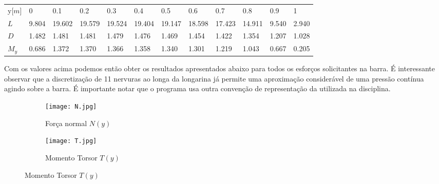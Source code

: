 \documentclass[a4paper]{article}
\begin{document}
\begin{table}[H]
    \begin{tabular}{llllllllllll}
    y{[}$m${]}   & 0                          & 0.1                         & 0.2                         & 0.3                         & 0.4                         & 0.5                         & 0.6                         & 0.7                         & 0.8                         & 0.9                        & 1                          \\ \cline{2-12} 
    \multicolumn{1}{l|}{$L$} & \multicolumn{1}{l|}{9.804} & \multicolumn{1}{l|}{19.602} & \multicolumn{1}{l|}{19.579} & \multicolumn{1}{l|}{19.524} & \multicolumn{1}{l|}{19.404} & \multicolumn{1}{l|}{19.147} & \multicolumn{1}{l|}{18.598} & \multicolumn{1}{l|}{17.423} & \multicolumn{1}{l|}{14.911} & \multicolumn{1}{l|}{9.540} & \multicolumn{1}{l|}{2.940} \\ \cline{2-12} 
    \multicolumn{1}{l|}{$D$}     & \multicolumn{1}{l|}{1.482} & \multicolumn{1}{l|}{1.481}  & \multicolumn{1}{l|}{1.481}  & \multicolumn{1}{l|}{1.479}  & \multicolumn{1}{l|}{1.476}  & \multicolumn{1}{l|}{1.469}  & \multicolumn{1}{l|}{1.454}  & \multicolumn{1}{l|}{1.422}  & \multicolumn{1}{l|}{1.354}  & \multicolumn{1}{l|}{1.207} & \multicolumn{1}{l|}{1.028} \\ \cline{2-12} 
    \multicolumn{1}{l|}{$M_y$}     & \multicolumn{1}{l|}{0.686} & \multicolumn{1}{l|}{1.372}  & \multicolumn{1}{l|}{1.370}  & \multicolumn{1}{l|}{1.366}  & \multicolumn{1}{l|}{1.358}  & \multicolumn{1}{l|}{1.340}  & \multicolumn{1}{l|}{1.301}  & \multicolumn{1}{l|}{1.219}  & \multicolumn{1}{l|}{1.043}  & \multicolumn{1}{l|}{0.667} & \multicolumn{1}{l|}{0.205} \\ \cline{2-12} 
    \end{tabular}
\end{table}

Com os valores acima podemos então obter os resultados apresentados abaixo para todos os esforços solicitantes na barra. É interessante observar que a discretização de 11 nervuras ao longa da longarina já permite uma aproximação considerável de uma pressão contínua agindo sobre a barra. É importante notar que o programa usa outra convenção de representação da utilizada na disciplina.

\begin{figure}[H]
    \begin{subfigure}[b]{0.48\textwidth}
      \texttt{[image: N.jpg]}
      \caption*{Força normal $N(y)$}
    \end{subfigure}
    \begin{subfigure}[b]{0.48\textwidth}
      \texttt{[image: T.jpg]}
      \caption*{Momento Torsor $T(y)$}
    \end{subfigure}
\end{figure}
\end{document}

